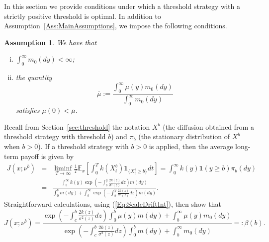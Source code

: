 \documentclass[12pt]{article}
\newtheorem{assumption}[theorem]{Assumption}
\begin{document}
In this section we provide conditions under which a threshold strategy with a strictly positive threshold is optimal. 
In addition to Assumption~\ref{Ass:MainAssumptions}, we impose the following conditions.

\begin{assumption}\label{hit 0}
We have that
\begin{enumerate}[(i)]
    \item 
    $\int_0^\infty m_0(dy)<\infty$;
    \item 
    the quantity 
\[\overline\mu:=\frac{\int_0^{\infty}\mu(y)m_0(dy)}{\int_0^\infty m_0(dy)}\]
    satisfies $\mu(0)<\overline\mu$.
\end{enumerate}
\end{assumption}

Recall from Section~\ref{sec:threshold} the notation $X^b$ (the diffusion obtained from a threshold strategy with threshold $b$) and $\pi_b$ (the stationary distribution of $X^b$ when $b>0$).
If a threshold strategy with $b>0$ is applied, then the average long-term payoff is given by
\begin{eqnarray*}
J(x;\nu^b) &=&    \liminf_{T\to\infty}\frac{1}{T}\mathbb E_x\left[\int_0^Tk(X_t^b) \mathbf{1}_{\{X^b_t \geq b\}} dt\right] =
    \int_0^{\infty}  k(y) \mathbf{1}(y \geq b) \pi_b(dy)\\
   &=& \frac{\int_b^{\infty} k(y)\exp\left(-\int_b^y \frac{2k(z)}{\sigma^2(z)}dz \right)m(dy)}{\int_0^{b}m(dy) + \int_{b}^{\infty} \exp\left(-\int_b^y \frac{2k(z)}{\sigma^2(z)}dz \right)m(dy)}.
    \end{eqnarray*}
Straightforward calculations, using (\ref{Eq:ScaleDriftInt}), then show that
\begin{equation}\label{beta(b)}
    J(x;\nu^b) = \frac{\exp\left(-\int_c^b\frac{2k(z)}{\sigma^2(z)}dz\right)\int_0^{b} \mu(y)m(dy) +
\int_{b}^{\infty} \mu(y)m_0(dy)}{\exp\left(-\int_c^b\frac{2k(z)}{\sigma^2(z)}dz\right)\int_0^{b}m(dy)+\int_{b}^{\infty} m_0(dy)}=:\beta(b).
\end{equation}
    
\end{document}
